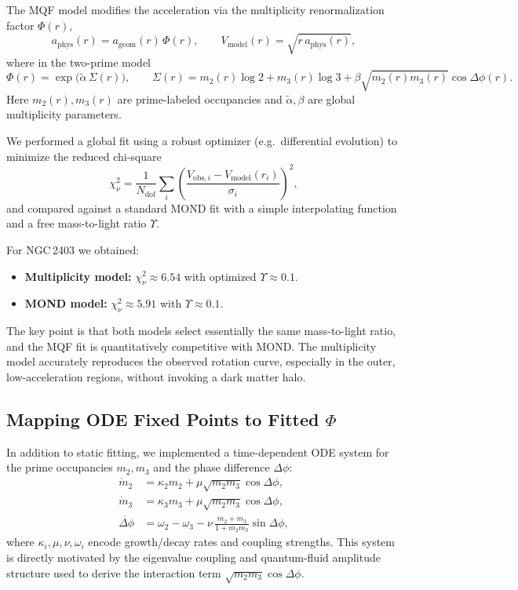 \documentclass[11pt]{article}
\begin{document}
The MQF model modifies the acceleration via the multiplicity renormalization factor \(\Phi(r)\),
\begin{equation}
a_{\mathrm{phys}}(r) = a_{\mathrm{geom}}(r)\,\Phi(r),\qquad
V_{\mathrm{model}}(r) = \sqrt{r\,a_{\mathrm{phys}}(r)},
\end{equation}
where in the two-prime model
\begin{equation}
\Phi(r) = \exp\!\big(\tilde{\alpha}\,\Sigma(r)\big),\qquad
\Sigma(r) = m_2(r)\log 2 + m_3(r)\log 3 + \beta \sqrt{m_2(r)m_3(r)}\cos\Delta\phi(r).
\end{equation}
Here \(m_2(r),m_3(r)\) are prime-labeled occupancies and \(\tilde{\alpha},\beta\) are global multiplicity parameters.

We performed a global fit using a robust optimizer (e.g.\ differential evolution) to minimize the reduced chi-square
\begin{equation}
\chi^2_\nu = \frac{1}{N_{\mathrm{dof}}}
\sum_i \left(\frac{V_{\mathrm{obs},i} - V_{\mathrm{model}}(r_i)}{\sigma_i}\right)^2,
\end{equation}
and compared against a standard MOND fit with a simple interpolating function and a free mass-to-light ratio \(\Upsilon\).

For NGC\,2403 we obtained:
\begin{itemize}
  \item \textbf{Multiplicity model:} \(\chi^2_\nu \approx 6.54\) with optimized \(\Upsilon \approx 0.1\).
  \item \textbf{MOND model:} \(\chi^2_\nu \approx 5.91\) with \(\Upsilon \approx 0.1\).
\end{itemize}
The key point is that both models select essentially the same mass-to-light ratio, and the MQF fit is quantitatively competitive with MOND. The multiplicity model accurately reproduces the observed rotation curve, especially in the outer, low-acceleration regions, without invoking a dark matter halo.

\subsection{Mapping ODE Fixed Points to Fitted \texorpdfstring{\(\Phi\)}{Phi}}

In addition to static fitting, we implemented a time-dependent ODE system for the prime occupancies \(m_2,m_3\) and the phase difference \(\Delta\phi\):
\begin{align}
\dot m_2 &= \kappa_2 m_2 + \mu\sqrt{m_2 m_3}\cos\Delta\phi,\\
\dot m_3 &= \kappa_3 m_3 + \mu\sqrt{m_2 m_3}\cos\Delta\phi,\\
\dot{\Delta\phi} &= \omega_2 - \omega_3 - \nu\,\frac{m_2+m_3}{1+m_2 m_3}\sin\Delta\phi,
\end{align}
where \(\kappa_i,\mu,\nu,\omega_i\) encode growth/decay rates and coupling strengths. This system is directly motivated by the eigenvalue coupling and quantum-fluid amplitude structure used to derive the interaction term \(\sqrt{m_2 m_3}\cos\Delta\phi\).
\end{document}
